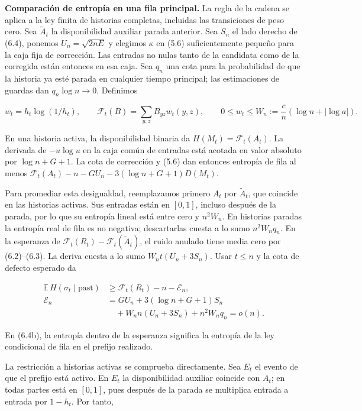 \documentclass[spanish,11pt,a4paper]{article}
\begin{document}
\textbf{Comparación de entropía en una fila principal.} La regla de la cadena se aplica a la ley finita de historias completas, incluidas las transiciones de peso cero. Sea \(\widetilde A_t\) la disponibilidad auxiliar parada anterior. Sea \(S_n\) el lado derecho de (6.4), ponemos \(U_n=\sqrt{2nE}\) y elegimos \(\kappa\) en (5.6) suficientemente pequeño para la caja fija de corrección. Las entradas no nulas tanto de la candidata como de la corregida están entonces en esa caja. Sea \(q_n\) una cota para la probabilidad de que la historia ya esté parada en cualquier tiempo principal; las estimaciones de guardas dan \(q_n\log n\to0\). Definimos

\nopagebreak[4]
\[w_t=h_t\log(1/h_t),\qquad
\mathcal F_t(B)=\sum_{y,z}B_{yz}w_t(y,z),\qquad
0\le w_t\le W_n:=\frac cn(\log n+|\log a|).\tag{6.4a}\]

En una historia activa, la disponibilidad binaria da \(H(M_t)=\mathcal F_t(A_t)\). La derivada de \(-u\log u\) en la caja común de entradas está acotada en valor absoluto por \(\log n+G+1\). La cota de corrección y (5.6) dan entonces entropía de fila al menos \(\mathcal F_t(A_t)-n-GU_n-3(\log n+G+1)D(M_t)\).

Para promediar esta desigualdad, reemplazamos primero \(A_t\) por \(\widetilde A_t\), que coincide en las historias activas. Sus entradas están en \([0,1]\), incluso después de la parada, por lo que su entropía lineal está entre cero y \(n^2W_n\). En historias paradas la entropía real de fila es no negativa; descartarlas cuesta a lo sumo \(n^2W_nq_n\). En la esperanza de \(\mathcal F_t(R_t)-\mathcal F_t(\widetilde A_t)\), el ruido anulado tiene media cero por (6.2)--(6.3). La deriva cuesta a lo sumo \(W_nt(U_n+3S_n)\). Usar \(t\le n\) y la cota de defecto esperado da

\nopagebreak[4]
\[\begin{aligned}
\mathbb E\,H(\sigma_t\mid\mathrm{past})&\ge\mathcal F_t(R_t)-n-\mathcal E_n,\\
\mathcal E_n&=GU_n+3(\log n+G+1)S_n\\
&\quad+W_nn(U_n+3S_n)+n^2W_nq_n=o(n).
\end{aligned}\tag{6.4b}\]

En (6.4b), la entropía dentro de la esperanza significa la entropía de la ley condicional de fila en el prefijo realizado.

La restricción a historias activas se comprueba directamente. Sea \(E_t\) el evento de que el prefijo está activo. En \(E_t\) la disponibilidad auxiliar coincide con \(A_t\); en todas partes está en \([0,1]\), pues después de la parada se multiplica entrada a entrada por \(1-h_t\). Por tanto,
\end{document}
